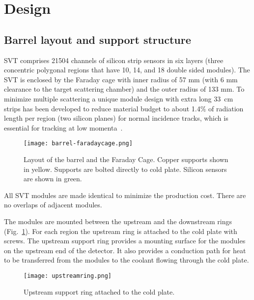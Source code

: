 \section{Design}

\subsection{Barrel layout and support structure}

SVT comprises 21504 channels of silicon strip sensors in six layers (three concentric polygonal regions that have 10, 14, and 18 double sided modules). The SVT is enclosed by the Faraday cage with inner radius of 57 mm (with 6 mm clearance to the target scattering chamber) and the outer radius of 133 mm. To minimize multiple scattering a unique module design with extra long 33~cm strips has been developed to reduce material budget to about 1.4$\%$ of radiation length per region (two silicon planes) for normal incidence tracks, which is essential for tracking at low momenta~\cite{Vertex2016}. 

\begin{figure}[hbt] 
\centering 
\texttt{[image: barrel-faradaycage.png]}
\caption{Layout of the barrel and the Faraday Cage. Copper supports shown in yellow.  Supports are bolted directly to cold plate. Silicon sensors are shown in green.}
\label{fig:barrel-faradaycage}
\end{figure}

All SVT modules are made identical to minimize the production cost. There are no overlaps of adjacent modules.



The modules  are mounted between the upstream and the downstream rings (Fig.~\ref{fig:barrel-faradaycage}). For each region the upstream ring is attached to the cold plate with screws. The upstream support ring provides a mounting surface for the modules on the upstream end of the detector. It also provides a conduction path for heat to be transferred from the modules to the coolant flowing through the cold plate. 

\begin{figure}[hbt] 
\centering 
\texttt{[image: upstreamring.png]}
\caption{Upstream support ring attached to the cold plate.}
\label{fig:upstreamring}
\end{figure}

